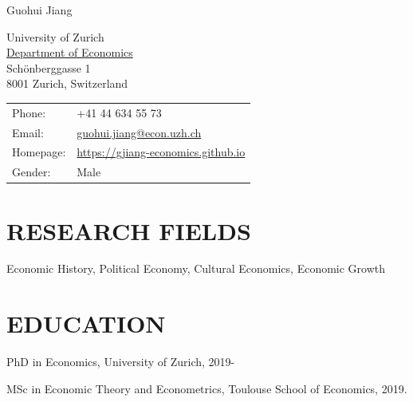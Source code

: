 \documentclass[letterpaper]{article}
\def\name{Guohui Jiang}
\renewenvironment{itemize}{
  \begin{list}{}{
    \setlength{\leftmargin}{1.5em}
  }
}{
  \end{list}
}
\begin{document}

{\huge \name}

\vspace{0.25in}

\begin{minipage}{0.45\linewidth}
  University of Zurich \\
  \href{https://www.econ.uzh.ch/en.html}{Department of Economics} \\
  Schönberggasse 1 \\
  8001 Zurich, Switzerland
\end{minipage}
\begin{minipage}{0.45\linewidth}
  \begin{tabular}{ll}
    Phone: & +41 44 634 55 73 \\
    Email: & \href{mailto:guohui.jiang@econ.uzh.ch}{guohui.jiang@econ.uzh.ch} \\
    Homepage: & \href{https://gjiang-economics.github.io}{https://gjiang-economics.github.io} \\
    Gender: & Male
  \end{tabular}
\end{minipage}

\section*{\MakeUppercase{Research Fields}}
\begin{itemize}
	\item Economic History, Political Economy, Cultural Economics, Economic Growth
\end{itemize}

\section*{\MakeUppercase{education}}
\begin{itemize}
  \item PhD in Economics, University of Zurich, 2019-
  \item MSc in Economic Theory and Econometrics, Toulouse School of Economics, 2019.

\end{itemize}
\end{document}
